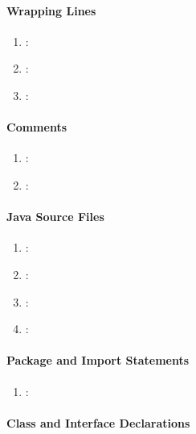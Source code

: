 \paragraph{Wrapping Lines} %
\label{par:wrapping_lines}

\begin{enumerate} [resume]
	\item \emph{\checkO}:
	\item \emph{\checkP}:
	\item \emph{\checkQ}:
\end{enumerate}

\paragraph{Comments} %
\label{par:comments}

\begin{enumerate} [resume]
	\item \emph{\checkR}:
	\item \emph{\checkS}:
\end{enumerate}


\paragraph{Java Source Files} %
\label{par:java_source_files}

\begin{enumerate} [resume]
	\item \emph{\checkT}:
	\item \emph{\checkU}:
	\item \emph{\checkV}:
	\item \emph{\checkW}:
\end{enumerate}

\paragraph{Package and Import Statements} %
\label{par:package_and_import_statements}

\begin{enumerate} [resume]
	\item \emph{\checkX}:
\end{enumerate}

\paragraph{Class and Interface Declarations} %
\label{par:class_and_interface_declarations}

